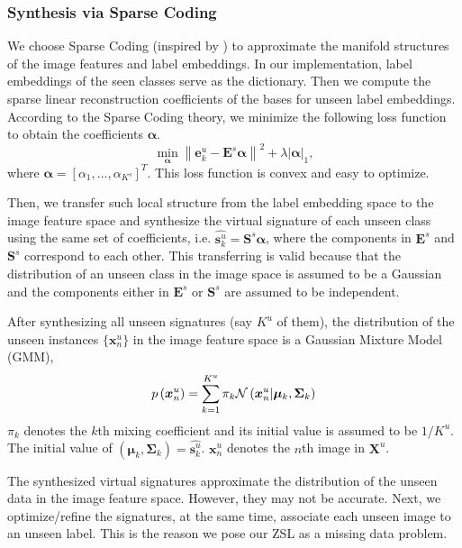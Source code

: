 \documentclass{article}
\begin{document}
\subsubsection{Synthesis via Sparse Coding}
We choose Sparse Coding\cite{olshausen1997sparse} (inspired by \cite{wang2016relational}) to approximate the manifold structures of the image features and label embeddings. In our implementation, label embeddings of the seen classes serve as the dictionary. Then we compute the sparse linear reconstruction coefficients of the bases for unseen label embeddings.
According to the Sparse Coding theory, we minimize the following loss function to obtain the coefficients $\bm{\alpha}$.
\begin{equation}
\min_{\bm{\alpha} } \left \| \bm{e}^u_k -  \bm{E}^s\bm{\alpha} \right \|^2 + \lambda | \bm{\alpha} |_1,
\end{equation}
where $\bm{\alpha} = {[\alpha_1,...,\alpha_{K^s}]}^T $. This loss function is convex and easy to optimize.

Then, we transfer such local structure from the label embedding space to the image feature space and synthesize the virtual signature of each unseen class using the same set of coefficients, i.e. $  \widehat{\bm{s}^u_k} = \bm{S}^s \bm{\alpha}$, where the components in $\bm{E}^s$ and $\bm{S}^s$ correspond to each other. This transferring is valid because that the distribution of an unseen class in the image space is assumed to be a Gaussian and the components either in $\bm{E}^s$ or $\bm{S}^s$ are assumed to be independent.

After synthesizing all unseen signatures (say $K^u$ of them), the distribution of the unseen instances $\{\bm{x}^u_n\}$ in the image feature space is a Gaussian Mixture Model (GMM),
\begin{equation}
p\left( {\bm{x}^u_n} \right) = \sum\limits_{k = 1}^{K^u} {{\pi_k}{\cal N}\left( {\bm{x}^u_n|{\bm{\mu}_k},{\bm{\Sigma}_k}} \right)}
\label{equ:GMM}
\end{equation}
$\pi _k$ denotes the $k$th mixing coefficient and its initial value is assumed to be $1/K^u$. The initial value of $(\bm{\mu}_k,\bm{\Sigma}_k)=\widehat{\bm{s}^u_k}$. $\bm{x}^u_n$ denotes the $n$th image in $\bm{X}^u$.

The synthesized virtual signatures approximate the distribution of the unseen data in the image feature space. However, they may not be accurate. Next, we optimize/refine the signatures, at the same time, associate each unseen image to an unseen label. This is the reason we pose our ZSL as a missing data problem.
\end{document}
